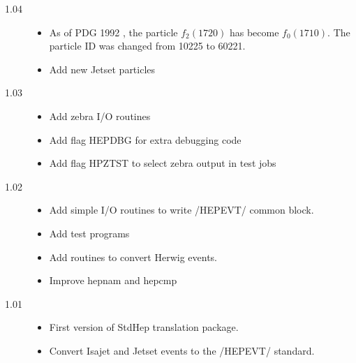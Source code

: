 \begin{description}
\item[1.04]

\begin{itemize}
\item As of PDG 1992 \cite{pdg92}, the particle $f_2(1720)$ 
has become $f_0(1710)$.  The particle ID was changed from 10225 to 60221.
\item Add new Jetset particles
\end{itemize}

\item[1.03]

\begin{itemize}
\item Add zebra I/O routines
\item Add flag HEPDBG for extra debugging code
\item Add flag HPZTST to select zebra output in test jobs
\end{itemize}

\item[1.02]

\begin{itemize}
\item Add simple I/O routines to write /HEPEVT/ common block.
\item Add test programs
\item Add routines to convert Herwig events.  
\item Improve hepnam and hepcmp
\end{itemize}

\item[1.01]

\begin{itemize}
\item First version of StdHep translation package.
\item Convert Isajet and Jetset events to the /HEPEVT/ standard.
\end{itemize}

\end{description}
